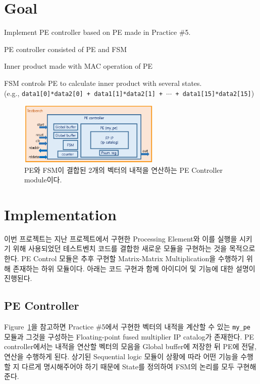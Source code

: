 \documentclass{article}
\begin{document}
\pagestyle{fancy}

\section*{Goal}

\begin{itemize*}
\item Implement PE controller based on PE made in Practice \#5.
\begin{itemize*}
\item PE controller consisted of PE and FSM
\item Inner product made with MAC operation of PE
\end{itemize*}
\item FSM controls PE to calculate inner product with several states. \\
(e.g., \texttt{data1[0]*data2[0] + data1[1]*data2[1] + $\cdots$ + data1[15]*data2[15]})
\end{itemize*}
\begin{figure}[ht]
	\centering
	\includegraphics[width=0.6\textwidth]{fig/fig1.png}
\caption{PE와 FSM이 결합된 2개의 벡터의 내적을 연산하는 PE Controller module이다.}
\label{fig1}
\end{figure}

\section{Implementation}
이번 프로젝트는 지난 프로젝트에서 구현한 Processing Element와 이를 실행을 시키기 위해 사용되었던 테스트벤치 코드를 결합한 새로운 모듈을 구현하는 것을 목적으로 한다. PE Control 모듈은 추후 구현할 Matrix-Matrix Multiplication을 수행하기 위해 존재하는 하위 모듈이다. 아래는 코드 구현과 함께 아이디어 및 기능에 대한 설명이 진행된다.

\subsection{PE Controller}
Figure~\ref{fig1}을 참고하면 Practice \#5에서 구현한 벡터의 내적을 계산할 수 있는 \texttt{my\_pe} 모듈과 그것을 구성하는 Floating-point fused multiplier IP catalog가 존재한다. PE controller에서는 내적을 연산할 벡터의 모음을 Global buffer에 저장한 뒤 PE에 전달, 연산을 수행하게 된다. 상기된 Sequential logic 모듈이 상황에 따라 어떤 기능을 수행할 지 다르게 명시해주어야 하기 때문에 State를 정의하여 FSM의 논리를 모두 구현해준다.\\
\end{document}
